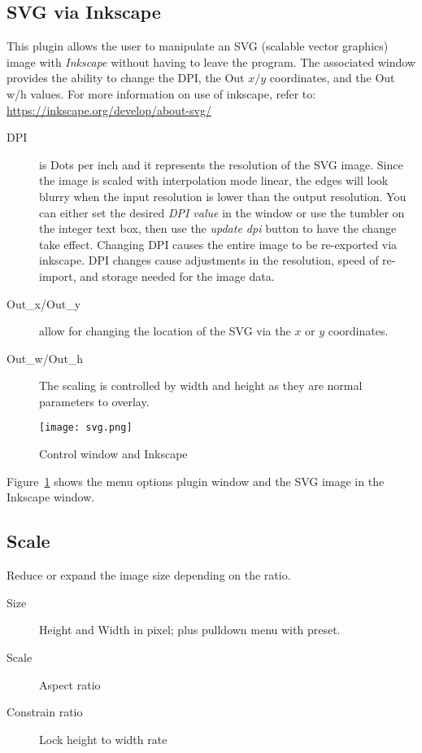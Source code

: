 \subsection{SVG via Inkscape}%
\label{sub:svg_via_inkscape}

This plugin allows the user to manipulate an SVG (scalable vector graphics) image with \textit{Inkscape} without having to leave the program. The associated \CGG{} window provides the ability to change the DPI, the Out $x/y$ coordinates, and the Out w/h values. For more information on use of inkscape, refer to: {\small \url{https://inkscape.org/develop/about-svg/}}

\begin{description}
    \item[DPI] is Dots per inch and it represents the resolution of the SVG image. Since the image is scaled with interpolation mode linear, the edges will look blurry when the input resolution is lower than the output resolution. You can either set the desired \textit{DPI value} in the window or use the tumbler on the integer text box, then use the \textit{update dpi} button to have the change take effect. Changing DPI causes the entire image to be re-exported via inkscape. DPI changes cause adjustments in the resolution, speed of re-import, and storage needed for the image data.
    \item[Out\_x/Out\_y] allow for changing the location of the SVG via the $x$ or $y$ coordinates.
    \item[Out\_w/Out\_h]  The scaling is controlled by width and height as they are normal parameters to overlay.
\end{description}

\begin{figure}[hbtp]
	\centering
	\texttt{[image: svg.png]}
	\caption{Control window and Inkscape}
	\label{fig:svg}
\end{figure}

Figure~\ref{fig:svg} shows the menu options plugin window and the SVG image in the Inkscape window.

\subsection{Scale}%
\label{sub:scale}

Reduce or expand the image size depending on the ratio.

\begin{description}
    \item[Size] Height and Width in pixel; plus pulldown menu with preset.
    \item[Scale] Aspect ratio
    \item[Constrain ratio] Lock height to width rate
\end{description}


